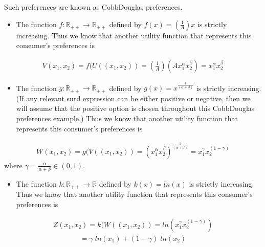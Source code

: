 \documentclass[letterpaper,10pt,english]{jupyterBook}
\begin{document}
\sphinxAtStartPar
Such preferences are known as Cobb\sphinxhyphen{}Douglas preferences.
\begin{itemize}
\item {} 
\sphinxAtStartPar
The function \(f: \mathbb{R}_{++} \rightarrow \mathbb{R}_{++}\) defined by \(f(x) = \left( \frac{1}{A} \right)x\) is strictly increasing. Thus we know that another utility function that represents this consumer’s preferences is

\end{itemize}
\begin{equation*}
\begin{split}V(x_1, x_2) = f(U((x_1, x_2)) = \left( \frac{1}{A} \right) (Ax_1^\alpha x_2^\beta) 
= x_1^\alpha x_2^\beta\end{split}
\end{equation*}\begin{itemize}
\item {} 
\sphinxAtStartPar
The function \(g: \mathbb{R}_{++} \rightarrow \mathbb{R}_{++}\) defined by \(g(x) = x^{\frac{1}{(\alpha + \beta)}}\) is strictly increasing. (If any relevant surd expression can be either positive or negative, then we will assume that the positive option is chosen throughout this Cobb\sphinxhyphen{}Douglas preferences example.) Thus we know that another utility function that represents this consumer’s preferences is

\end{itemize}
\begin{equation*}
\begin{split}W(x_1, x_2) = g(V((x_1, x_2)) = (x_1^\alpha x_2^\beta)^{\frac{1}{(\alpha + \beta)}}
= x_1^\gamma x_2^{(1 - \gamma)}\end{split}
\end{equation*}
\sphinxAtStartPar
where \( \gamma = \frac{\alpha}{\alpha + \beta} \in (0, 1)\).
\begin{itemize}
\item {} 
\sphinxAtStartPar
The function \(k: \mathbb{R}_{++} \rightarrow \mathbb{R}\) defined by \(k(x) = ln(x )\) is strictly increasing. Thus we know that another utility function that represents this consumer’s preferences is

\end{itemize}
\begin{equation*}
\begin{split}Z(x_1, x_2) = k(W((x_1, x_2)) = ln (x_1^\gamma x_2^{(1 - \gamma)})\end{split}
\end{equation*}\begin{equation*}
\begin{split}= \gamma \; ln(x_1) + (1 − \gamma) \; ln(x_2) \end{split}
\end{equation*}
\end{document}
